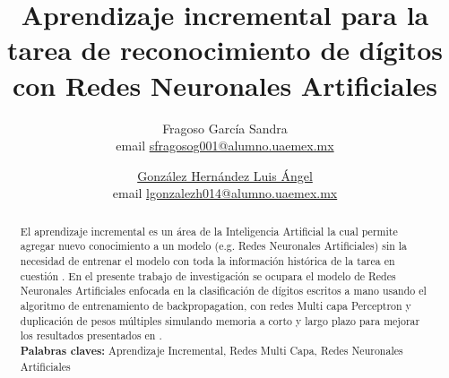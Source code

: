 \documentclass[10pt,a4paper]{article}
\title{Aprendizaje incremental para la tarea de reconocimiento
de dígitos con Redes Neuronales Artificiales}
\author{
    Fragoso García Sandra \\ email \href{mailto:sfragosog001@alumno.uaemex.mx}{sfragosog001@alumno.uaemex.mx}
    \and \underline{González Hernández Luis Ángel} \\ email \href{mailto:lgonzalezh014@alumno.uaemex.mx}{lgonzalezh014@alumno.uaemex.mx}
}
\begin{document}
    
    
    \tableofcontents
    \listoffigures
    \newpage
    \maketitle
    \begin{abstract}
        El aprendizaje incremental es un área de la Inteligencia Artificial la cual permite agregar nuevo conocimiento 
        a un modelo (e.g. Redes Neuronales Artificiales) sin la necesidad de entrenar el modelo con toda la información 
        histórica de la tarea en cuestión \cite{bullinaria2009}. En el presente trabajo de investigación se ocupara el modelo de Redes 
        Neuronales Artificiales enfocada en la clasificación de dígitos escritos a mano usando el algoritmo de 
        entrenamiento de backpropagation, con redes Multi capa Perceptron y duplicación de pesos múltiples 
        simulando memoria a corto y largo plazo para mejorar los resultados presentados en \cite{bullinaria2009}.\\

        \textbf{Palabras claves:} Aprendizaje Incremental, Redes Multi Capa, Redes Neuronales Artificiales
    \end{abstract}

    
    
    
    
    
    
    
    
    
    
    
    

	
    
\end{document}
